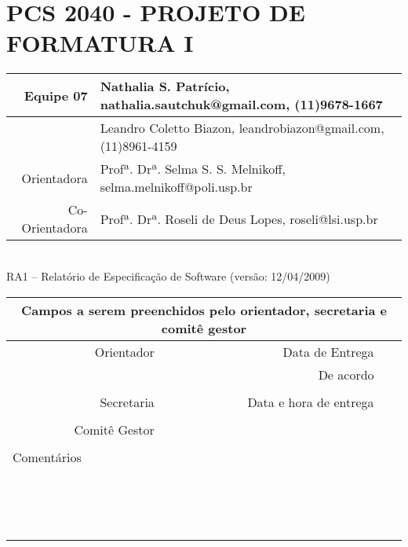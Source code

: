 \documentclass[a4paper,12pt,font=plain,header=plain]{abnt}
\begin{document}
  \setcounter{secnumdepth}{-1}
  \capa

  \renewenvironment{center}{}{}
  \section{PCS 2040 - PROJETO DE FORMATURA I}

    \begin{tabular}[|l|]{ |r|l| }
    \hline
			Equipe 07 & Nathalia S. Patrício, nathalia.sautchuk@gmail.com, (11)9678-1667 \\
		\hline
			& Leandro Coletto Biazon, leandrobiazon@gmail.com, (11)8961-4159 \\
		\hline
			Orientadora & Profª. Drª. Selma S. S. Melnikoff, selma.melnikoff@poli.usp.br \\
		\hline
			Co-Orientadora & Profª. Drª. Roseli de Deus Lopes, roseli@lsi.usp.br \\
		\hline
		\end{tabular} \\

		RA1 – Relatório de Especificação de Software (versão: 12/04/2009) \\

		\begin{tabular}{ |r|r|r| }

		\hline
			\multicolumn{3}{|c|}{Campos a serem preenchidos pelo orientador, secretaria e comitê gestor} \\
		\hline
			Orientador & Data de Entrega &  \\
		\hline
			& De acordo &  \\
		\hline
			& &  \\
		\hline
			Secretaria & Data e hora de entrega &  \\
		\hline
			&  &  \\
		\hline
			Comitê Gestor &  &  \\
		\hline
			&  &  \\
		\hline
			\multicolumn{3}{|l|}{Comentários} \\
			\multicolumn{3}{|l|}{} \\
			\multicolumn{3}{|l|}{} \\
			\multicolumn{3}{|l|}{} \\
			\multicolumn{3}{|l|}{} \\
			\multicolumn{3}{|l|}{} \\
			\multicolumn{3}{|l|}{} \\
			\multicolumn{3}{|l|}{} \\
			\multicolumn{3}{|l|}{} \\
			\multicolumn{3}{|l|}{} \\
			\multicolumn{3}{|l|}{} \\
			\multicolumn{3}{|l|}{} \\
			\multicolumn{3}{|l|}{} \\
			\multicolumn{3}{|l|}{} \\
			\multicolumn{3}{|l|}{} \\
			\multicolumn{3}{|l|}{} \\
		\hline
		\end{tabular}
\end{document}
